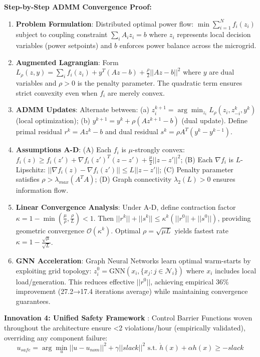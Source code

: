 \documentclass[12pt]{article}
\begin{document}
\textbf{Step-by-Step ADMM Convergence Proof:}
\begin{enumerate}
\item \textbf{Problem Formulation}: Distributed optimal power flow: $\min \sum_{i=1}^N f_i(z_i)$ subject to coupling constraint $\sum_i A_i z_i = b$ where $z_i$ represents local decision variables (power setpoints) and $b$ enforces power balance across the microgrid.
\item \textbf{Augmented Lagrangian}: Form $L_\rho(z,y) = \sum_i f_i(z_i) + y^T(Az - b) + \frac{\rho}{2}||Az - b||^2$ where $y$ are dual variables and $\rho > 0$ is the penalty parameter. The quadratic term ensures strict convexity even when $f_i$ are merely convex.
\item \textbf{ADMM Updates}: Alternate between: (a) $z_i^{k+1} = \arg\min_{z_i} L_\rho(z_i, z_{-i}^k, y^k)$ (local optimization); (b) $y^{k+1} = y^k + \rho(Az^{k+1} - b)$ (dual update). Define primal residual $r^k = Az^k - b$ and dual residual $s^k = \rho A^T(y^k - y^{k-1})$.
\item \textbf{Assumptions A-D}: (A) Each $f_i$ is $\mu$-strongly convex: $f_i(z) \geq f_i(z') + \nabla f_i(z')^T(z-z') + \frac{\mu}{2}||z-z'||^2$; (B) Each $\nabla f_i$ is $L$-Lipschitz: $||\nabla f_i(z) - \nabla f_i(z')|| \leq L||z-z'||$; (C) Penalty parameter satisfies $\rho > \lambda_{max}(A^T A)$; (D) Graph connectivity $\lambda_2(L) > 0$ ensures information flow.
\item \textbf{Linear Convergence Analysis}: Under A-D, define contraction factor $\kappa = 1 - \min\left(\frac{\mu}{\rho}, \frac{\rho}{L}\right) < 1$. Then $||r^k|| + ||s^k|| \leq \kappa^k(||r^0|| + ||s^0||)$, providing geometric convergence $\mathcal{O}(\kappa^k)$. Optimal $\rho = \sqrt{\mu L}$ yields fastest rate $\kappa = 1 - \frac{\sqrt{\mu}}{\sqrt{L}}$.
\item \textbf{GNN Acceleration}: Graph Neural Networks learn optimal warm-starts by exploiting grid topology: $z_i^0 = \text{GNN}(x_i, \{x_j : j \in \mathcal{N}_i\})$ where $x_i$ includes local load/generation. This reduces effective $||r^0||$, achieving empirical 36\% improvement (27.2→17.4 iterations average) while maintaining convergence guarantees.
\end{enumerate}

\textbf{Innovation 4: Unified Safety Framework} \cite{our2024theoretical}: Control Barrier Functions woven throughout the architecture ensure <2 violations/hour (empirically validated), overriding any component failure:
$$u_{safe} = \arg\min_u ||u - u_{nom}||^2 + \gamma||slack||^2 \text{ s.t. } \dot{h}(x) + \alpha h(x) \geq -slack$$
\end{document}

